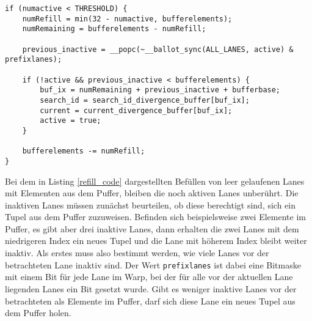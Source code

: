 \begin{lstlisting}[language=MyC++,
caption=Befüllen inaktiver Lanes mit Elementen aus dem Puffer,
label=refill_code]
if (numactive < THRESHOLD) {
	numRefill = min(32 - numactive, bufferelements);
	numRemaining = bufferelements - numRefill;
	
	previous_inactive = __popc(~__ballot_sync(ALL_LANES, active) & prefixlanes);
	
	if (!active && previous_inactive < bufferelements) {
		buf_ix = numRemaining + previous_inactive + bufferbase;
		search_id = search_id_divergence_buffer[buf_ix];
		current = current_divergence_buffer[buf_ix];
		active = true;
	}
	
	bufferelements -= numRefill;
}
\end{lstlisting}

Bei dem in Listing \ref{refill_code} dargestellten Befüllen von leer gelaufenen Lanes mit Elementen aus dem Puffer, bleiben die noch aktiven Lanes unberührt.
Die inaktiven Lanes müssen zunächst beurteilen, ob diese berechtigt sind, sich ein Tupel aus dem Puffer zuzuweisen.
Befinden sich beispielsweise zwei Elemente im Puffer, es gibt aber drei inaktive Lanes, dann erhalten die zwei Lanes mit dem niedrigeren Index ein neues Tupel und die Lane mit höherem Index bleibt weiter inaktiv.
Als erstes muss also bestimmt werden, wie viele Lanes vor der betrachteten Lane inaktiv sind.
Der Wert \texttt{prefixlanes} ist dabei eine Bitmaske mit einem Bit für jede Lane im Warp, bei der für alle vor der aktuellen Lane liegenden Lanes ein Bit gesetzt wurde.
Gibt es weniger inaktive Lanes vor der betrachteten als Elemente im Puffer, darf sich diese Lane ein neues Tupel aus dem Puffer holen.

